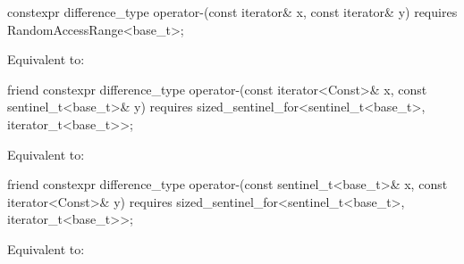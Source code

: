\begin{itemdecl}
constexpr difference_type operator-(const iterator& x, const iterator& y)
  requires RandomAccessRange<base_t>;
\end{itemdecl}

\begin{itemdescr}
\pnum
\effects
Equivalent to: 
\end{itemdescr}

\begin{itemdecl}
friend constexpr difference_type
  operator-(const iterator<Const>& x, const sentinel_t<base_t>& y)
    requires sized_sentinel_for<sentinel_t<base_t>, iterator_t<base_t>>;
\end{itemdecl}

\begin{itemdescr}
\pnum
\effects
Equivalent to: 
\end{itemdescr}

\begin{itemdecl}
friend constexpr difference_type
  operator-(const sentinel_t<base_t>& x, const iterator<Const>& y)
    requires sized_sentinel_for<sentinel_t<base_t>, iterator_t<base_t>>;
\end{itemdecl}

\begin{itemdescr}
\pnum
\effects
Equivalent to: 
\end{itemdescr}
